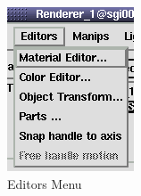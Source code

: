  \latexonly
 \begin{figure}[htp]
  \begin{center}
   \includegraphics[scale=0.7]{renderer/pict/editors}
   \caption{Editors Menu}
	\label{fig62}
  \end{center}
 \end{figure}
 \endlatexonly

